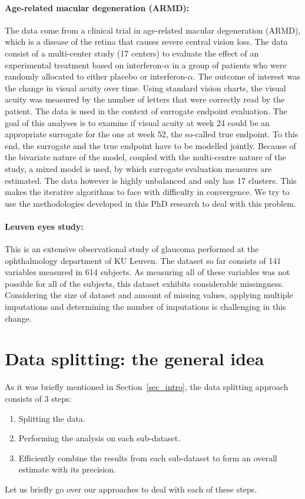 \documentclass[14pt]{article}
\begin{document}
\paragraph*{Age-related macular degeneration (ARMD):} The data come from a clinical trial in age-related macular degeneration (ARMD), which is a disease of the retina that causes severe central vision loss. The data consist of a multi-center study (17 centers) to evaluate the effect of an experimental treatment based on interferon-$\alpha$ in a group of patients who were randomly allocated to either placebo or interferon-$\alpha$. The outcome of interest was the change in visual acuity over time. Using standard vision charts, the visual acuity was measured by the number of letters that were correctly read by the patient. The data is used in the context of surrogate endpoint evaluation. The goal of this analyses is to examine if  visual acuity at week 24 could be an appropriate surrogate for the one at week 52, the so-called true endpoint. To this end, the surrogate and the true endpoint have to be modelled jointly. Because of the bivariate nature of the model, coupled with the multi-centre nature of the study, a mixed model is used, by which surrogate evaluation measures are estimated. The data however is highly unbalanced and only has 17 clusters. This makes the iterative algorithms to face with difficulty in convergence. We try to use the methodologies developed in this PhD research to deal with this problem.

\paragraph*{Leuven eyes study:} This is an extensive observational study of glaucoma performed at the ophthalmology department of KU Leuven. The dataset so far consists of 141 variables measured in 614 subjects. As measuring all of these variables was not possible for all of the subjects, this dataset exhibits considerable missingness. Considering the size of dataset and amount of missing values, applying multiple imputations and determining the number of imputations is challenging in this change. 

\section{Data splitting: the general idea}
\label{sec_idea}
As it was briefly mentioned in Section~\ref{sec_intro}, the data splitting approach consists of 3 steps:
\begin{enumerate}
\item Splitting the data.
\item Performing the analysis on each sub-dataset.
\item Efficiently combine the results from each sub-dataset to form an overall estimate with its precision.
\end{enumerate}
Let us briefly go over our approaches to deal with each of these steps. 
\end{document}
